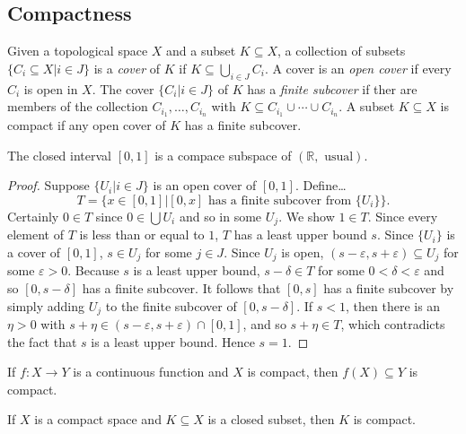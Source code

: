 \subsection{Compactness}\label{compactness}
Given a topological space $X$ and a subset $K \subseteq X$, a collection of subsets $\{ C_i \subseteq X | i \in J \}$ is a
\emph{cover} of $K$ if $K \subseteq \bigcup_{i \in J} C_i$. A cover is an \emph{open cover} if every $C_i$ is open in $X$.
The cover $\{ C_i | i \in J \}$ of $K$ has a \emph{finite subcover} if ther are members of the collection $C_{i_1},\dots,C_{i_n}$
with $K \subseteq C_{i_1} \cup \cdots \cup C_{i_n}$. A subset $K \subseteq X$ is compact if any open cover of $K$ has a finite subcover.

\begin{theorem}
\label{heineboreltheorem}
The closed interval $[0,1]$ is a compace subspace of $(\mathbb{R}, \textrm{ usual})$.
\end{theorem}

\begin{proof}
Suppose $\{ U_i | i \in J \}$ is an open cover of $[0,1]$. Define\dots
$$T = \{ x \in [0,1] | [0,x] \textrm{ has a finite subcover from } \{U_i\}\}.$$
Certainly $0 \in T$ since $0 \in \bigcup U_i$ and so in some $U_j$. We show $1 \in T$. Since every element of $T$ is less than or equal to $1$, $T$
has a least upper bound $s$. Since $\{ U_i \}$ is a cover of $[0,1]$, $s \in U_j$ for some $j \in J$. Since $U_j$ is open, $(s - \varepsilon, s + \varepsilon) \subseteq U_j$
for some $\varepsilon > 0$. Because $s$ is a least upper bound, $s - \delta \in T$ for some $0 < \delta < \varepsilon$ and so $[0, s - \delta]$ has a finite subcover. It
follows that $[0,s]$ has a finite subcover by simply adding $U_j$ to the finite subcover of $[0,s-\delta].$ If $s < 1$, then there is an $\eta > 0$ with $s + \eta \in (s -\varepsilon, s + \varepsilon) \cap [0,1]$,
and so $s + \eta \in T$, which contradicts the fact that $s$ is a least upper bound. Hence $s = 1$.
\end{proof}

\begin{theorem}
\label{imageofcompactspace}
If $f : X \rightarrow Y$ is a continuous function and $X$ is compact, then $f(X) \subseteq Y$ is compact.
\end{theorem}

\begin{proposition}
If $X$ is a compact space and $K \subseteq X$ is a closed subset, then $K$ is compact.
\end{proposition}

